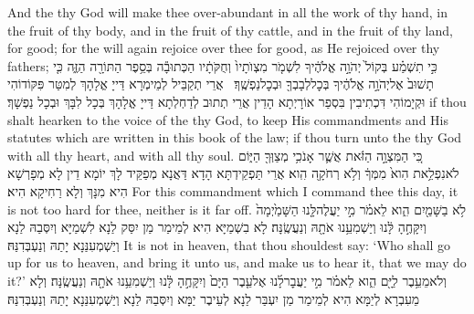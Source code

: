 {And the \lord\space thy God will make thee over-abundant in all the work of thy hand, in the fruit of thy body, and in the fruit of thy cattle, and in the fruit of thy land, for good; for the \lord\space will again rejoice over thee for good, as He rejoiced over thy fathers;}{}
{כִּ֣י תִשְׁמַ֗ע בְּקוֹל֙ יְהֹוָ֣ה אֱלֹהֶ֔יךָ לִשְׁמֹ֤ר מִצְוֺתָיו֙ וְחֻקֹּתָ֔יו הַכְּתוּבָ֕ה בְּסֵ֥פֶר הַתּוֹרָ֖ה הַזֶּ֑ה כִּ֤י תָשׁוּב֙ אֶל\maqqaf יְהֹוָ֣ה אֱלֹהֶ֔יךָ בְּכׇל\maqqaf לְבָבְךָ֖ וּבְכׇל\maqqaf נַפְשֶֽׁךָ׃ \setuma }
{אֲרֵי תְקַבֵּיל לְמֵימְרָא דַּייָ אֱלָהָךְ לְמִטַּר פִּקּוֹדוֹהִי וּקְיָמוֹהִי דִּכְתִיבִין בִּסְפַר אוֹרָיְתָא הָדֵין אֲרֵי תְתוּב לְדַחְלְתָא דַּייָ אֱלָהָךְ בְּכָל לִבָּךְ וּבְכָל נַפְשָׁךְ׃}
{if thou shalt hearken to the voice of the \lord\space thy God, to keep His commandments and His statutes which are written in this book of the law; if thou turn unto the \lord\space thy God with all thy heart, and with all thy soul.}{}
{כִּ֚י הַמִּצְוָ֣ה הַזֹּ֔את אֲשֶׁ֛ר אָנֹכִ֥י מְצַוְּךָ֖ הַיּ֑וֹם לֹא\maqqaf נִפְלֵ֥את הִוא֙ מִמְּךָ֔ וְלֹ֥א רְחֹקָ֖ה הִֽוא׃}
{אֲרֵי תַּפְקֵידְתָּא הָדָא דַּאֲנָא מְפַקֵּיד לָךְ יוֹמָא דֵין לָא מְפָרְשָׁא הִיא מִנָּךְ וְלָא רַחִיקָא הִיא׃}
{For this commandment which I command thee this day, it is not too hard for thee, neither is it far off.}{}
{לֹ֥א בַשָּׁמַ֖יִם הִ֑וא לֵאמֹ֗ר מִ֣י יַעֲלֶה\maqqaf לָּ֤נוּ הַשָּׁמַ֙יְמָה֙ וְיִקָּחֶ֣הָ לָּ֔נוּ וְיַשְׁמִעֵ֥נוּ אֹתָ֖הּ וְנַעֲשֶֽׂנָּה׃}
{לָא בִשְׁמַיָּא הִיא לְמֵימַר מַן יִסַּק לַנָא לִשְׁמַיָּא וְיִסְּבַהּ לַנָא וְיַשְׁמְעִנַּנָא יָתַהּ וְנַעְבְּדִנַּהּ׃}
{It is not in heaven, that thou shouldest say: ‘Who shall go up for us to heaven, and bring it unto us, and make us to hear it, that we may do it?’}{}
{וְלֹא\maqqaf מֵעֵ֥בֶר לַיָּ֖ם הִ֑וא לֵאמֹ֗ר מִ֣י יַעֲבׇר\maqqaf לָ֜נוּ אֶל\maqqaf עֵ֤בֶר הַיָּם֙ וְיִקָּחֶ֣הָ לָּ֔נוּ וְיַשְׁמִעֵ֥נוּ אֹתָ֖הּ וְנַעֲשֶֽׂנָּה׃}
{וְלָא מֵעִבְרָא לְיַמָּא הִיא לְמֵימַר מַן יִעְבַּר לַנָא לְעֵיבֶר יַמָּא וְיִסְּבַהּ לַנָא וְיַשְׁמְעִנַּנָא יָתַהּ וְנַעְבְּדִנַּהּ׃}
